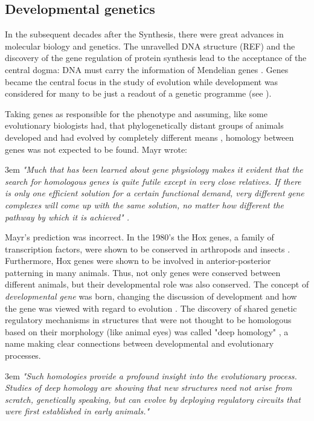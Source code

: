 \subsection{Developmental genetics}

In the subsequent decades after the Synthesis, there were great advances in molecular biology and genetics. The unravelled DNA structure (REF) and the discovery of the gene regulation of protein synthesis \citep{Jacob1961} lead to the acceptance of the central dogma: DNA must carry the information of Mendelian genes \citep{Crick1958,Crick1970}. 
Genes became the central focus in the study of evolution while development was considered for many to be just a readout of a genetic programme (see \citealp{foxkeller2000geneprogram}).

Taking genes as responsible for the phenotype and assuming, like some evolutionary biologists had, that phylogenetically distant groups of animals developed and had evolved by completely different means \citep{carroll2005endless}, homology between genes was not expected to be found. Mayr wrote:
\begin{flushleft}
\leftskip3em
\rightskip\leftskip
\footnotesize{
\textit{
"Much that has been learned about gene physiology makes it evident that the search for homologous genes is quite futile except in very close relatives. If there is only one efficient solution for a certain functional demand, very different gene complexes will come up with the same solution, no matter how different the pathway by which it is achieved" \citep{Mayr1966}.}}
\end{flushleft}

Mayr's prediction was incorrect. In the 1980's the Hox genes, a family of transcription factors, were shown to be conserved in arthropods and insects \citep{McGinnis1984,Duboule1989}.
Furthermore, Hox genes were shown to be involved in anterior-posterior patterning in many animals.
Thus, not only genes were conserved between different animals, but their developmental role was also conserved. 
The concept of \textit{developmental gene} was born, changing the discussion of development and how the gene was viewed with regard to evolution \citep{gilbert2000developmentalgene}.
The discovery of shared genetic regulatory mechanisms in structures that were not thought to be homologous based on their morphology (like animal eyes) was called "deep homology" \citep{Shubin1997}, a name making clear connections between developmental and evolutionary processes.
\begin{flushleft}
\leftskip3em
\rightskip\leftskip
\footnotesize{
\textit{
"Such homologies provide a profound insight into the evolutionary process.
Studies of deep homology are showing that new structures need not arise from scratch, genetically speaking, but can evolve by deploying regulatory circuits that were first established in early
animals." \citep{Shubin2009} }}
\end{flushleft}

